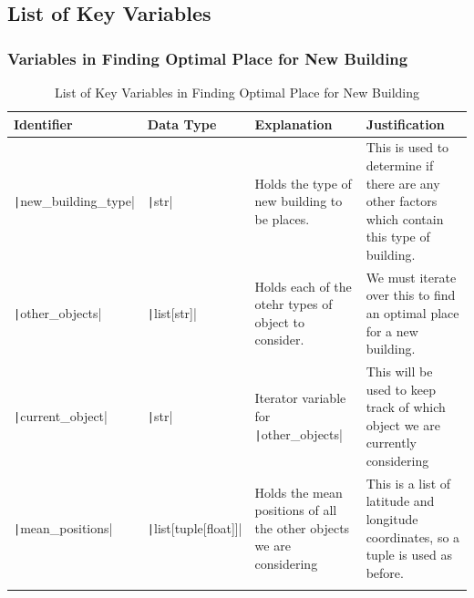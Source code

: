 \documentclass[12pt]{report}
\newcommand{\pil}[1]{\texttt|#1|}
\begin{document}
\subsection{List of Key Variables}
\subsubsection{Variables in Finding Optimal Place for New Building}
\begin{center}
\begin{longtable}{ | m{3cm} | m{4cm}| m{4cm} | m{4cm} |} 
    \hline
    \textbf{Identifier} & \textbf{Data Type} & \textbf{Explanation}  & \textbf{Justification} \\ 
    \hline
    \pil{new_building_type} & \pil{str} & Holds the type of new building to be places. & This is used to determine if there are any other factors which contain this type of building. \\ 
    \hline
    \pil{other_objects} & \pil{list[str]} & Holds each of the otehr types of object to consider. & We must iterate over this to find an optimal place for a new building. \\ 
    \hline
    \pil{current_object} & \pil{str} & Iterator variable for \pil{other_objects} & This will be used to keep track of which object we are currently considering \\ 
    \hline
    \pil{mean_positions} & \pil{list[tuple[float]]} & Holds the mean positions of all the other objects we are considering & This is a list of latitude and longitude coordinates, so a tuple is used as before. \\ 
    \hline
\caption{List of Key Variables in Finding Optimal Place for New Building}
\end{longtable}
\end{center}
\end{document}

